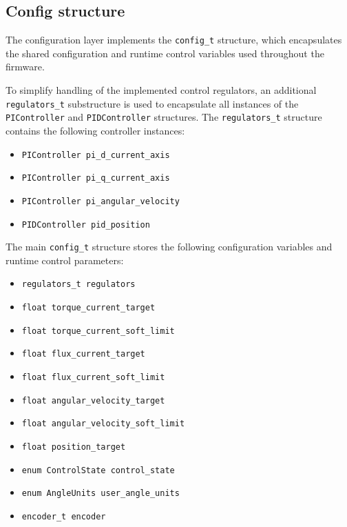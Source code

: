 \subsection{Config structure}
The configuration layer implements the \texttt{config\_t} structure,
which encapsulates the shared configuration and runtime control variables used throughout the firmware.

To simplify handling of the implemented control regulators,
an additional \texttt{regulators\_t} substructure is used to encapsulate all instances of the \texttt{PIController} and \texttt{PIDController} structures.
The \texttt{regulators\_t} structure contains the following controller instances:

\begin{itemize}
    \item \texttt{PIController pi\_d\_current\_axis}
    \item \texttt{PIController pi\_q\_current\_axis}
    \item \texttt{PIController pi\_angular\_velocity}
    \item \texttt{PIDController pid\_position}
\end{itemize}

The main \texttt{config\_t} structure stores the following configuration variables and runtime control parameters:

\begin{itemize}
    \item \texttt{regulators\_t regulators}

    \item \texttt{float torque\_current\_target}
    \item \texttt{float torque\_current\_soft\_limit}

    \item \texttt{float flux\_current\_target}
    \item \texttt{float flux\_current\_soft\_limit}

    \item \texttt{float angular\_velocity\_target}
    \item \texttt{float angular\_velocity\_soft\_limit}

    \item \texttt{float position\_target}

    \item \texttt{enum ControlState control\_state}
    \item \texttt{enum AngleUnits user\_angle\_units}

    \item \texttt{encoder\_t encoder}
\end{itemize}


